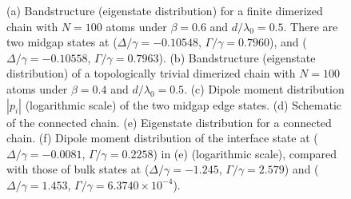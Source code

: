\documentclass[aps,pra,reprint,groupedaddress,nofootinbib,longbibliography,showpacs]{revtex4-1}
\begin{document}
\begin{figure}[htbp]
	\centering
	\flushleft
	\hspace{0.01in}
	\hspace{0.01in}
	\hspace{0.01in}
	\hspace{0.01in}
	\hspace{0.01in}
	\caption{ (a) Bandstructure (eigenstate distribution) for a finite dimerized chain with $N=100$ atoms under $\beta=0.6$ and $d/\lambda_0=0.5$. There are two midgap states at ($\Delta/\gamma=-0.10548$, $\Gamma/\gamma=0.7960$), and ($\Delta/\gamma=-0.10558$, $\Gamma/\gamma=0.7963$). (b) Bandstructure (eigenstate distribution) of a topologically trivial dimerized chain with $N=100$ atoms under $\beta=0.4$ and $d/\lambda_0=0.5$. (c) Dipole moment distribution $|p_i|$ (logarithmic scale) of the two midgap edge states. (d) Schematic of the connected chain. (e) Eigenstate distribution for a connected chain.  (f) Dipole moment distribution of the interface state at ($\Delta/\gamma=-0.0081$, $\Gamma/\gamma=0.2258$) in (e) (logarithmic scale), compared with those of bulk states at ($\Delta/\gamma=-1.245$, $\Gamma/\gamma=2.579$) and ($\Delta/\gamma=1.453$, $\Gamma/\gamma=6.3740\times10^{-4}$).} 
	\label{edgemode}
\end{figure}
\end{document}
